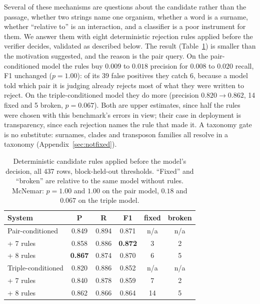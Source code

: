 \documentclass[11pt]{article}
\begin{document}
Several of these mechanisms are questions about the candidate rather than the passage, whether
two strings name one organism, whether a word is a surname, whether ``relative to'' is an
interaction, and a classifier is a poor instrument for them. We answer them with eight
deterministic rejection rules applied before the verifier decides, validated as described below.
The result (Table~\ref{tab:rules}) is smaller than the motivation suggested, and the
reason is the pair query. On the pair-conditioned model the rules buy $0.009$ to $0.018$
precision for $0.008$ to $0.020$ recall, F1 unchanged ($p = 1.00$): of its 39 false positives they
catch 6, because a model told which pair it is judging already rejects most of what they were
written to reject. On the triple-conditioned model they do more
(precision $0.820 \to 0.862$, 14 fixed and 5 broken, $p = 0.067$). Both are upper estimates, since
half the rules were chosen with this benchmark's errors in view; their case in deployment is
transparency, since each rejection names the rule that made it. A taxonomy gate is no substitute:
surnames, clades and transposon families all resolve in a taxonomy (Appendix~\ref{sec:notfixed}).

\begin{table}[t]\centering\small
\setlength{\tabcolsep}{3.6pt}
\begin{tabular}{lccccc}
\toprule
System & P & R & F1 & fixed & broken \\
\midrule
Pair-conditioned          & 0.849 & 0.894 & 0.871 & n/a & n/a \\
\quad + 7 rules           & 0.858 & 0.886 & \textbf{0.872} & 3 & 2 \\
\quad + 8 rules           & \textbf{0.867} & 0.874 & 0.870 & 6 & 5 \\
\midrule
Triple-conditioned        & 0.820 & 0.886 & 0.852 & n/a & n/a \\
\quad + 7 rules           & 0.840 & 0.878 & 0.859 & 7 & 2 \\
\quad + 8 rules           & 0.862 & 0.866 & 0.864 & 14 & 5 \\
\bottomrule
\end{tabular}
\caption{Deterministic candidate rules applied before the model's decision, all 437 rows,
block-held-out thresholds. ``Fixed'' and ``broken'' are relative to the same model without rules.
McNemar: $p = 1.00$ and $1.00$ on the pair model, $0.18$ and $0.067$ on the triple model.}
\label{tab:rules}
\end{table}
\end{document}
